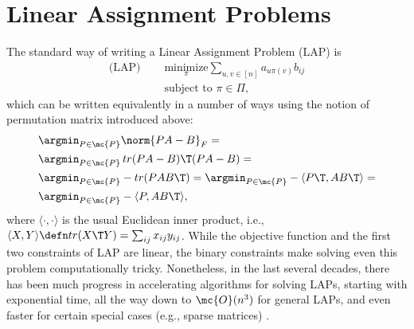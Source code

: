 \documentclass[10pt,journal,cspaper,compsoc]{IEEEtran}
\newcommand{\PmcP}{P \in \mc{P}}
\begin{document}
\appendix

\section{Linear Assignment Problems} %


The standard way of writing a Linear Assignment Problem (LAP) is
\begin{subequations} \label{eq:LAP}
\begin{align}
	 \text{(LAP) }\quad  &\underset{\pi}{\text{minimize}} \sum_{u,v \in [n]} a_{u \pi(v)} b_{ij} \\
	&\text{subject to } \pi \in \Pi,
\end{align}
\end{subequations}
which can be written equivalently in a number of ways using the notion of permutation matrix introduced above:
\begin{subequations} \label{eq:LAP2}
\begin{align}
	&\argmin_{\PmcP} \norm{PA - B}_F =\\
	&\argmin_{\PmcP} \, tr(PA-B)\T (PA-B)=\\ 
	&\argmin_{\PmcP}  -tr (P AB\T) = \argmin_{\PmcP}  -\langle P\T, AB\T \rangle = \label{eq:2c} \\
	&\argmin_{\PmcP}  -\langle P, AB\T \rangle, \label{eq:dotLAP}
\end{align}
\end{subequations}
where $\langle \cdot,\cdot \rangle$ %
is the usual Euclidean inner product, i.e., $\langle X,Y\rangle \defn tr(X\T Y)= \sum_{ij} x_{ij} y_{ij}$.
While the objective function and the first two constraints of LAP are linear, the binary constraints make solving even this problem computationally tricky.  Nonetheless, in the last several decades, there has been much progress in accelerating algorithms for solving LAPs, starting with exponential time, all the way down to $\mc{O}(n^3)$ for general LAPs, and even faster for certain special cases (e.g., sparse matrices) \cite{Jonker1987, Burkard2009}.
\end{document}
